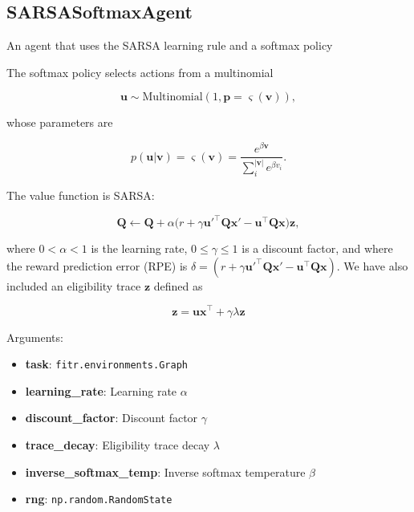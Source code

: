 \hypertarget{sarsasoftmaxagent}{%
\subsection{SARSASoftmaxAgent}\label{sarsasoftmaxagent}}

\begin{Shaded}
\begin{Highlighting}[]
\end{Highlighting}
\end{Shaded}

An agent that uses the SARSA learning rule and a softmax policy

The softmax policy selects actions from a multinomial

\[
\mathbf u \sim \mathrm{Multinomial}(1, \mathbf p=\varsigma(\mathbf v)),
\]

whose parameters are

\[
p(\mathbf u|\mathbf v) = \varsigma(\mathbf v) = \frac{e^{\beta \mathbf v}}{\sum_{i}^{|\mathbf v|} e^{\beta v_i}}.
\]

The value function is SARSA:

\[
\mathbf Q \gets \mathbf Q + \alpha \big(r + \gamma \mathbf u'^\top \mathbf Q \mathbf x' - \mathbf u^\top \mathbf Q \mathbf x \big) \mathbf z,
\]

where \(0 < \alpha < 1\) is the learning rate, \(0 \leq \gamma \leq 1\)
is a discount factor, and where the reward prediction error (RPE) is
\(\delta = (r + \gamma \mathbf u'^\top \mathbf Q \mathbf x' - \mathbf u^\top \mathbf Q \mathbf x)\).
We have also included an eligibility trace \(\mathbf z\) defined as

\[
\mathbf z = \mathbf u \mathbf x^\top +  \gamma \lambda \mathbf z
\]

Arguments:

\begin{itemize}
\tightlist
\item
  \textbf{task}: \texttt{fitr.environments.Graph}
\item
  \textbf{learning\_rate}: Learning rate \(\alpha\)
\item
  \textbf{discount\_factor}: Discount factor \(\gamma\)
\item
  \textbf{trace\_decay}: Eligibility trace decay \(\lambda\)
\item
  \textbf{inverse\_softmax\_temp}: Inverse softmax temperature \(\beta\)
\item
  \textbf{rng}: \texttt{np.random.RandomState}
\end{itemize}

